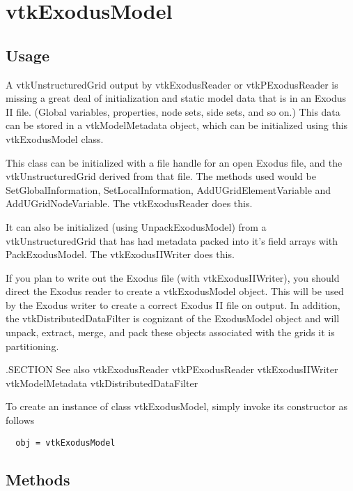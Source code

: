 \section{vtkExodusModel}

\subsection{Usage}


   A vtkUnstructuredGrid output by vtkExodusReader or vtkPExodusReader
   is missing a great deal of initialization and static model data 
   that is in an Exodus II file.  (Global variables, properties,
   node sets, side sets, and so on.)  This data can be stored in a 
   vtkModelMetadata object, which can be initialized using
   this vtkExodusModel class.

   This class can be initialized with a file handle for an open Exodus 
   file, and the vtkUnstructuredGrid derived from that file.  The methods 
   used would be SetGlobalInformation, SetLocalInformation, 
   AddUGridElementVariable and AddUGridNodeVariable.  The vtkExodusReader
   does this.

   It can also be initialized (using UnpackExodusModel) from a 
   vtkUnstructuredGrid that has had metadata packed into it's field 
   arrays with PackExodusModel.   The vtkExodusIIWriter does this.

   If you plan to write out the Exodus file (with vtkExodusIIWriter), 
   you should direct the Exodus reader to create a vtkExodusModel object.
   This will be used by the Exodus writer to create a correct Exodus II 
   file on output.  In addition, the vtkDistributedDataFilter is 
   cognizant of the ExodusModel object and will unpack, extract, merge, 
   and pack these objects associated with the grids it is partitioning.

 .SECTION See also
   vtkExodusReader  vtkPExodusReader vtkExodusIIWriter vtkModelMetadata
   vtkDistributedDataFilter

To create an instance of class vtkExodusModel, simply
invoke its constructor as follows
\begin{verbatim}
  obj = vtkExodusModel
\end{verbatim}
\subsection{Methods}

